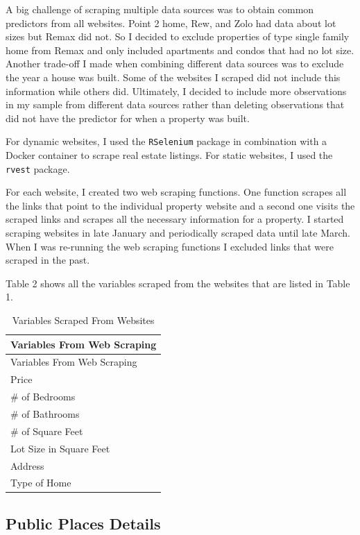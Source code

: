 \documentclass[
]{article}
\begin{document}
A big challenge of scraping multiple data sources was to obtain common
predictors from all websites. Point 2 home, Rew, and Zolo had data about
lot sizes but Remax did not. So I decided to exclude properties of type
single family home from Remax and only included apartments and condos
that had no lot size. Another trade-off I made when combining different
data sources was to exclude the year a house was built. Some of the
websites I scraped did not include this information while others did.
Ultimately, I decided to include more observations in my sample from
different data sources rather than deleting observations that did not
have the predictor for when a property was built.

For dynamic websites, I used the \texttt{RSelenium} package in
combination with a Docker container to scrape real estate listings. For
static websites, I used the \texttt{rvest} package.

For each website, I created two web scraping functions. One function
scrapes all the links that point to the individual property website and
a second one visits the scraped links and scrapes all the necessary
information for a property. I started scraping websites in late January
and periodically scraped data until late March. When I was re-running
the web scraping functions I excluded links that were scraped in the
past.

Table 2 shows all the variables scraped from the websites that are
listed in Table 1.

\begin{longtable}[]{@{}l@{}}
\caption{Variables Scraped From Websites}\tabularnewline
\toprule()
Variables From Web Scraping \\
\midrule()
\endfirsthead
\toprule()
Variables From Web Scraping \\
\midrule()
\endhead
Price \\
\# of Bedrooms \\
\# of Bathrooms \\
\# of Square Feet \\
Lot Size in Square Feet \\
Address \\
Type of Home \\
\bottomrule()
\end{longtable}

\hypertarget{public-places-details}{%
\subsection{Public Places Details}\label{public-places-details}}
\end{document}
